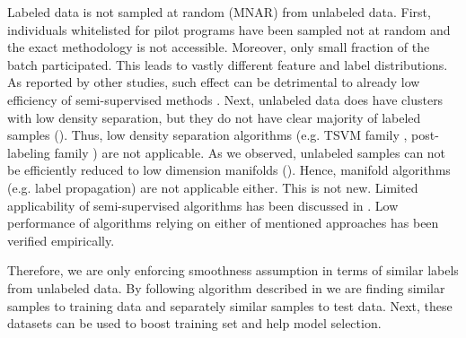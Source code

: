 \documentclass{article}
\begin{document}
Labeled data is not sampled at random (MNAR) from unlabeled data. First, individuals whitelisted for pilot programs have been sampled not at random and the exact methodology is not accessible. Moreover, only small fraction of the batch participated. This leads to vastly different feature and label distributions. As reported by other studies, such effect can be detrimental to already low efficiency of semi-supervised methods \cite{semi-comp-1}. Next, unlabeled data does have clusters with low density separation, but they do not have clear majority of labeled samples (). Thus, low density separation algorithms (e.g. TSVM family \cite{tsvm, tsvm1}, post-labeling family \cite{semi-post-label}) are not applicable. As we observed, unlabeled samples can not be efficiently reduced to low dimension manifolds (). Hence, manifold algorithms (e.g. label propagation) are not applicable either. This is not new. Limited applicability of semi-supervised algorithms has been discussed in \cite{semi-crit, semi-cluster, semi-comp}. Low performance of algorithms relying on either of mentioned approaches has been verified empirically.

Therefore, we are only enforcing smoothness assumption in terms of similar labels from unlabeled data. By following algorithm described in  we are finding similar samples to training data and separately similar samples to test data. Next, these datasets can be used to boost training set and help model selection.
\end{document}
